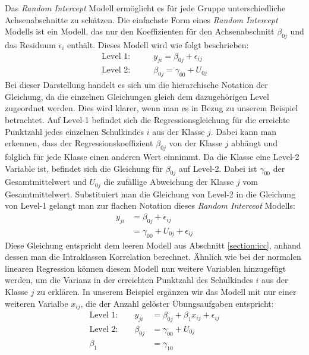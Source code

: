 \documentclass[12pt]{article}\usepackage[]{graphicx}\usepackage[]{color}
\numberwithin{equation}{section}
\begin{document}
Das \textit{Random Intercept} Modell ermöglicht es für jede Gruppe unterschiedliche Achsenabschnitte zu schätzen. Die einfachste Form eines \textit{Random Intercept} Modells ist ein Modell, das nur den Koeffizienten für den Achsenabschnitt $\beta_{0j}$ und das Residuum $\epsilon_i$ enthält. Dieses Modell wird wie folgt beschrieben:
\begin{equation}
\begin{split}	
\text{Level 1:} & \qquad y_{ji} 	= \beta_{0j} + \epsilon_{ij}\\
\text{Level 2:} & \qquad \beta_{0j} = \gamma_{00} + U_{0j}
\end{split}	
\end{equation} 
Bei dieser Darstellung handelt es sich um die hierarchische Notation der Gleichung, da die einzelnen Gleichungen gleich dem dazugehörigen Level zugeordnet werden. Dies wird klarer, wenn man es in Bezug zu unserem Beispiel betrachtet. Auf Level-1 befindet sich die Regressionsgleichung für die erreichte Punktzahl jedes einzelnen Schulkindes $i$ aus der Klasse $j$. Dabei kann man erkennen, dass der Regressionskoeffizient $\beta_{0j}$ von der Klasse $j$ abhängt und folglich für jede Klasse einen anderen Wert einnimmt. Da die Klasse eine Level-2 Variable ist, befindet sich die Gleichung für $\beta_{0j}$ auf Level-2. Dabei ist $\gamma_{00}$ der Gesamtmittelwert und $U_{0j}$ die zufällige Abweichung der Klasse $j$ vom Gesamtmittelwert. Substituiert man die Gleichung von Level-2 in die Gleichung von Level-1 gelangt man zur flachen Notation dieses \textit{Random Interceot} Modells:
\begin{equation}
\begin{split}
y_{ji} 	& = \beta_{0j} + \epsilon_{ij}\\
		& = \gamma_{00} + U_{0j} + \epsilon_{ij}
\end{split}
\end{equation}
Diese Gleichung entspricht dem leeren Modell aus Abschnitt \ref{section:icc}, anhand dessen man die Intraklassen Korrelation berechnet. Ähnlich wie bei der normalen linearen Regression können diesem Modell nun weitere Variablen hinzugefügt werden, um die Varianz in der erreichten Punktzahl des Schulkindes $i$ aus der Klasse $j$ zu erklären. In unserem Beispiel ergänzen wir das Modell mit nur einer weiteren Varialbe $x_{ij}$, die der Anzahl gelöster Übungsaufgaben entspricht:
\begin{equation} \label{eq:random_intercept_model}
\begin{split}	
 \text{Level 1:}  	\qquad 	y_{ji} 		& = \beta_{0j} + \beta_{1}x_{ij} + \epsilon_{ij}\\
 \text{Level 2:} 	\qquad 	\beta_{0j} 	& = \gamma_{00} + U_{0j}\\
 							\beta_{1} 	& = \gamma_{10}
\end{split}	
\end{equation} 
\end{document}
